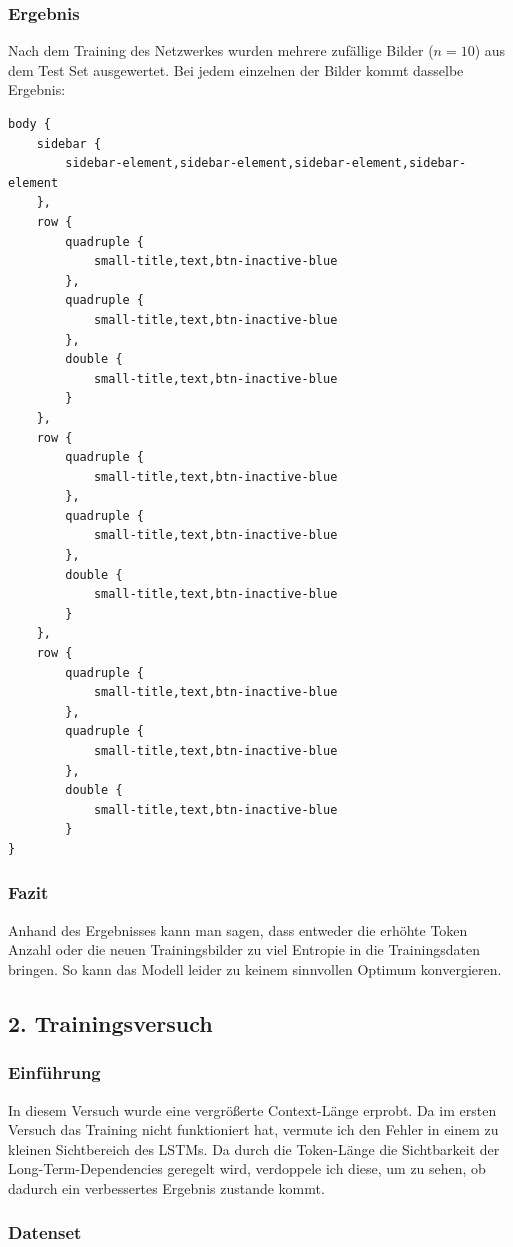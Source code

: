 \documentclass[pdftex,a4paper,halfparskip, article]{scrartcl}
\begin{document}
\subsubsection*{Ergebnis}

Nach dem Training des Netzwerkes wurden mehrere zufällige Bilder ($n=10$) aus dem Test Set ausgewertet. Bei jedem einzelnen der Bilder kommt dasselbe Ergebnis:

\begin{verbatim}
body {
	sidebar {
		sidebar-element,sidebar-element,sidebar-element,sidebar-element
	},
	row {
		quadruple {
			small-title,text,btn-inactive-blue
		},
		quadruple {
			small-title,text,btn-inactive-blue
		},
		double {
			small-title,text,btn-inactive-blue
		}
	},
	row {
		quadruple {
			small-title,text,btn-inactive-blue
		},
		quadruple {
			small-title,text,btn-inactive-blue
		},
		double {
			small-title,text,btn-inactive-blue
		}
	},
	row {
		quadruple {
			small-title,text,btn-inactive-blue
		},
		quadruple {
			small-title,text,btn-inactive-blue
		},
		double {
			small-title,text,btn-inactive-blue
		}
}
\end{verbatim}

\subsubsection*{Fazit}

Anhand des Ergebnisses kann man sagen, dass entweder die erhöhte Token Anzahl oder die neuen Trainingsbilder zu viel Entropie in die Trainingsdaten bringen. So kann das Modell leider zu keinem sinnvollen Optimum konvergieren. 


\subsection{2. Trainingsversuch}

\subsubsection*{Einführung}

In diesem Versuch wurde eine vergrößerte Context-Länge erprobt. Da im ersten Versuch das Training nicht funktioniert hat, vermute ich den Fehler in einem zu kleinen Sichtbereich des LSTMs. Da durch die Token-Länge die Sichtbarkeit der Long-Term-Dependencies geregelt wird, verdoppele ich diese, um zu sehen, ob dadurch ein verbessertes Ergebnis zustande kommt.

\subsubsection*{Datenset}
\end{document}
